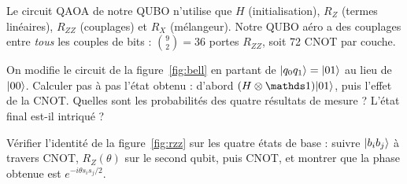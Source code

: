 \begin{projet}
Le circuit QAOA de notre QUBO n'utilise que $H$ (initialisation), $R_Z$ (termes linéaires), $R_{ZZ}$ (couplages) et $R_X$ (mélangeur). Notre QUBO aéro a des couplages entre \emph{tous} les couples de bits : $\binom92=36$ portes $R_{ZZ}$, soit 72 CNOT par couche.
\end{projet}

\exercices
\begin{exercice}
On modifie le circuit de la figure~\ref{fig:bell} en partant de $\lvert q_0q_1\rangle=\lvert 01\rangle$ au lieu de $\lvert 00\rangle$. Calculer pas à pas l'état obtenu : d'abord $(H\otimes\Id)\ket{01}$, puis l'effet de la CNOT. Quelles sont les probabilités des quatre résultats de mesure ? L'état final est-il intriqué ?
\end{exercice}
\begin{exercice}
Vérifier l'identité de la figure~\ref{fig:rzz} sur les quatre états de base : suivre $\lvert b_ib_j\rangle$ à travers CNOT, $R_Z(\theta)$ sur le second qubit, puis CNOT, et montrer que la phase obtenue est $e^{-i\theta s_is_j/2}$.
\end{exercice}
